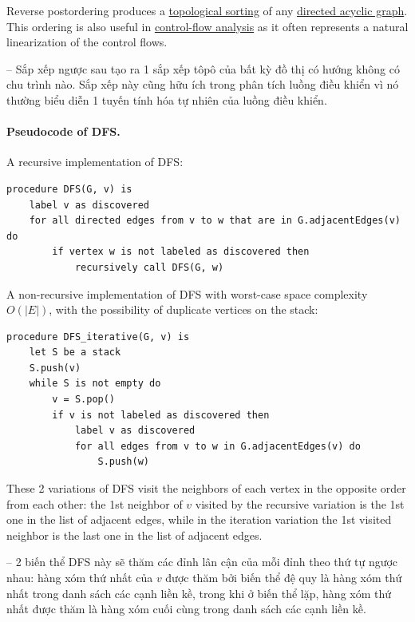\documentclass[oneside]{book}
\begin{document}
Reverse postordering produces a \href{https://en.wikipedia.org/wiki/Topological_sorting}{topological sorting} of any \href{https://en.wikipedia.org/wiki/Directed_acyclic_graph}{directed acyclic graph}. This ordering is also useful in \href{https://en.wikipedia.org/wiki/Control-flow_graph}{control-flow analysis} as it often represents a natural linearization of the control flows.

-- Sắp xếp ngược sau tạo ra 1 sắp xếp tôpô của bất kỳ đồ thị có hướng không có chu trình nào. Sắp xếp này cũng hữu ích trong phân tích luồng điều khiển vì nó thường biểu diễn 1 tuyến tính hóa tự nhiên của luồng điều khiển.

\paragraph{Pseudocode of DFS.} A recursive implementation of DFS:
\begin{verbatim}
procedure DFS(G, v) is
    label v as discovered
    for all directed edges from v to w that are in G.adjacentEdges(v) do
        if vertex w is not labeled as discovered then
            recursively call DFS(G, w)
\end{verbatim}
A non-recursive implementation of DFS with worst-case space complexity $O(|E|)$, with the possibility of duplicate vertices on the stack:
\begin{verbatim}
procedure DFS_iterative(G, v) is
    let S be a stack
    S.push(v)
    while S is not empty do
        v = S.pop()
        if v is not labeled as discovered then
            label v as discovered
            for all edges from v to w in G.adjacentEdges(v) do 
                S.push(w)
\end{verbatim}
These 2 variations of DFS visit the neighbors of each vertex in the opposite order from each other: the 1st neighbor of $v$ visited by the recursive variation is the 1st one in the list of adjacent edges, while in the iteration variation the 1st visited neighbor is the last one in the list of adjacent edges.

-- 2 biến thể DFS này sẽ thăm các đỉnh lân cận của mỗi đỉnh theo thứ tự ngược nhau: hàng xóm thứ nhất của $v$ được thăm bởi biến thể đệ quy là hàng xóm thứ nhất trong danh sách các cạnh liền kề, trong khi ở biến thể lặp, hàng xóm thứ nhất được thăm là hàng xóm cuối cùng trong danh sách các cạnh liền kề.
\end{document}
